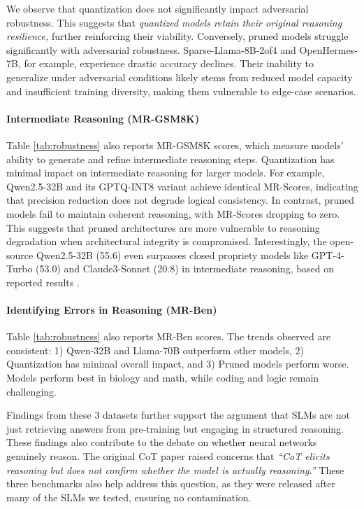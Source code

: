 We observe that quantization does not significantly impact adversarial robustness. This suggests that \emph{quantized models retain their original reasoning resilience,} further reinforcing their viability. Conversely, pruned models struggle significantly with adversarial robustness. Sparse-Llama-8B-2of4 and OpenHermes-7B, for example, experience drastic accuracy declines. Their inability to generalize under adversarial conditions likely stems from reduced model capacity and insufficient training diversity, making them vulnerable to edge-case scenarios. 


\paragraph{Intermediate Reasoning (MR-GSM8K)} Table \ref{tab:robustness} also reports MR-GSM8K scores, which measure models' ability to generate and refine intermediate reasoning steps. Quantization has minimal impact on intermediate reasoning for larger models. For example, Qwen2.5-32B and its GPTQ-INT8 variant achieve identical MR-Scores, indicating that precision reduction does not degrade logical consistency. In contrast, pruned models fail to maintain coherent reasoning, with MR-Scores dropping to zero. This suggests that pruned architectures are more vulnerable to reasoning degradation when architectural integrity is compromised. Interestingly, the open-source Qwen2.5-32B (55.6) even surpasses closed propriety models like GPT-4-Turbo (53.0) and Claude3-Sonnet (20.8) in intermediate reasoning, based on reported results \cite{zeng2024mrgsm8kmetareasoningbenchmarklarge}. 


\paragraph{Identifying Errors in Reasoning (MR-Ben)} Table \ref{tab:robustness} also reports MR-Ben scores. The trends observed are consistent: 1) Qwen-32B and Llama-70B outperform other models, 2) Quantization has minimal overall impact, and 3) Pruned models perform worse. Models perform best in biology and math, while coding and logic remain challenging. 

Findings from these 3 datasets further support the argument that SLMs are not just retrieving answers from pre-training but engaging in structured reasoning. These findings also contribute to the debate on whether neural networks genuinely reason. The original CoT paper \cite{wei2022chain} raised concerns that \emph{\enquote{CoT elicits reasoning but does not confirm whether the model is actually reasoning.}} These three benchmarks also help address this question, as they were released after many of the SLMs we tested, ensuring no contamination.


